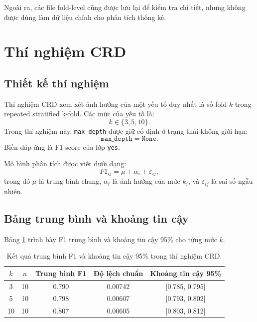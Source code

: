 \documentclass[12pt,a4paper]{article}
\begin{document}
Ngoài ra, các file fold-level cũng được lưu lại để kiểm tra chi tiết, nhưng không được dùng làm dữ liệu chính cho phân tích thống kê.

\section{Thí nghiệm CRD}

\subsection{Thiết kế thí nghiệm}

Thí nghiệm CRD xem xét ảnh hưởng của một yếu tố duy nhất là số fold $k$ trong repeated stratified k-fold. Các mức của yếu tố là:
\[
k \in \{3, 5, 10\}.
\]
Trong thí nghiệm này, \texttt{max\_depth} được giữ cố định ở trạng thái không giới hạn:
\[
\texttt{max\_depth} = \texttt{None}.
\]
Biến đáp ứng là F1-score của lớp \texttt{yes}.

Mô hình phân tích được viết dưới dạng:
\[
F1_{ij} = \mu + \alpha_i + \varepsilon_{ij},
\]
trong đó $\mu$ là trung bình chung, $\alpha_i$ là ảnh hưởng của mức $k_i$, và $\varepsilon_{ij}$ là sai số ngẫu nhiên.

\subsection{Bảng trung bình và khoảng tin cậy}

Bảng \ref{tab:crd_summary} trình bày F1 trung bình và khoảng tin cậy 95\% cho từng mức $k$.

\begin{table}[H]
    \centering
    \caption{Kết quả trung bình F1 và khoảng tin cậy 95\% trong thí nghiệm CRD.}
    \label{tab:crd_summary}
    \begin{tabular}{ccccc}
        \toprule
        $k$ & $n$ & Trung bình F1 & Độ lệch chuẩn & Khoảng tin cậy 95\% \\
        \midrule
        3  & 10 & 0.790 & 0.00742 & [0.785, 0.795] \\
        5  & 10 & 0.798 & 0.00607 & [0.793, 0.802] \\
        10 & 10 & 0.807 & 0.00605 & [0.803, 0.812] \\
        \bottomrule
    \end{tabular}
\end{table}
\end{document}
